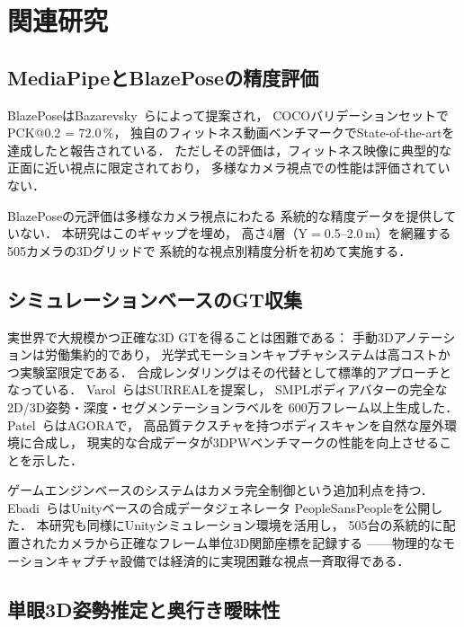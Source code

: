 \documentclass[twocolumn]{article}
\begin{document}
\section{関連研究}

\subsection{MediaPipeとBlazePoseの精度評価}

BlazePoseはBazarevsky~ら\cite{blazepose}によって提案され，
COCOバリデーションセットでPCK@0.2 = 72.0\,\%，
独自のフィットネス動画ベンチマークでState-of-the-artを達成したと報告されている．
ただしその評価は，フィットネス映像に典型的な正面に近い視点に限定されており，
多様なカメラ視点での性能は評価されていない．

BlazePoseの元評価\cite{blazepose}は多様なカメラ視点にわたる
系統的な精度データを提供していない．
本研究はこのギャップを埋め，
高さ4層（Y$=$0.5--2.0\,m）を網羅する505カメラの3Dグリッドで
系統的な視点別精度分析を初めて実施する．

\subsection{シミュレーションベースのGT収集}

実世界で大規模かつ正確な3D GTを得ることは困難である：
手動3Dアノテーションは労働集約的であり，
光学式モーションキャプチャシステムは高コストかつ実験室限定である．
合成レンダリングはその代替として標準的アプローチとなっている．
Varol~ら\cite{surreal}はSURREALを提案し，
SMPLボディアバターの完全な2D/3D姿勢・深度・セグメンテーションラベルを
600万フレーム以上生成した．
Patel~ら\cite{agora}はAGORAで，
高品質テクスチャを持つボディスキャンを自然な屋外環境に合成し，
現実的な合成データが3DPWベンチマークの性能を向上させることを示した．

ゲームエンジンベースのシステムはカメラ完全制御という追加利点を持つ．
Ebadi~ら\cite{peoplesanspeople}はUnityベースの合成データジェネレータ
PeopleSansPeopleを公開した．
本研究も同様にUnityシミュレーション環境を活用し，
505台の系統的に配置されたカメラから正確なフレーム単位3D関節座標を記録する
——物理的なモーションキャプチャ設備では経済的に実現困難な視点一斉取得である．

\subsection{単眼3D姿勢推定と奥行き曖昧性}
\end{document}
